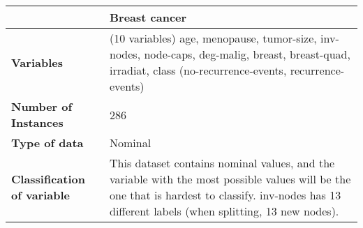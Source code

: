 \begin{table}[H]
		\begin{tabular}{ p{4cm} | p{8cm} }
			\hline
			\rowcolor{gray}
			 & {\bf Breast cancer} \\ \hline
			{\bf Variables} & (10 variables) age, menopause, tumor-size, inv-nodes, node-caps, deg-malig,
			breast, breast-quad, irradiat, class (no-recurrence-events, recurrence-events) \\ \hline
			{\bf Number of Instances} & 286 \\ \hline 
			{\bf Type of data} & Nominal \\ \hline
			{\bf Classification of variable} & This dataset contains nominal values, and the variable
			with the most possible values will be the one that is hardest to classify.
			inv-nodes has 13 different labels (when splitting, 13 new nodes).  \\ \hline
		\end{tabular}
	\end{table}